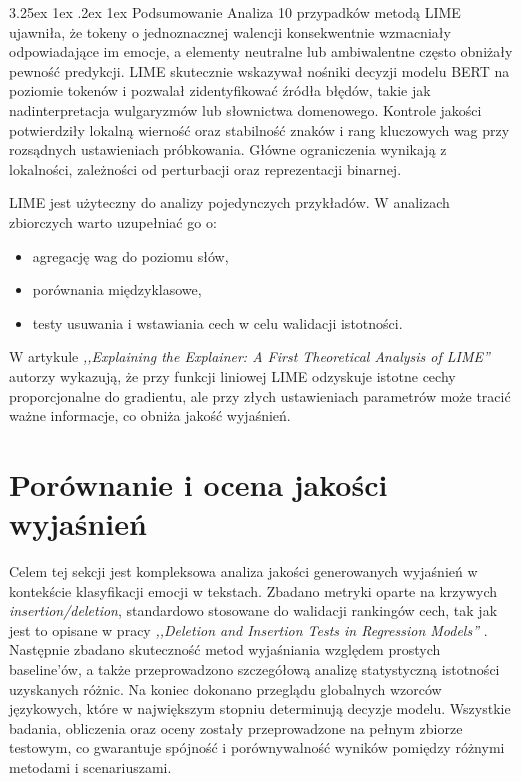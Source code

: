 \documentclass[wmii, inf, mgr]{uwmthesis}
\makeatletter
\renewcommand\paragraph{\@startsection{paragraph}{4}{\z@}%
  {3.25ex \@plus1ex \@minus.2ex}%
  {1ex}%
  {\normalfont\normalsize\bfseries}}
\makeatother
\begin{document}
\paragraph{Podsumowanie}
Analiza 10 przypadków metodą LIME ujawniła, że tokeny o jednoznacznej walencji konsekwentnie wzmacniały odpowiadające im emocje, a elementy neutralne lub ambiwalentne często obniżały pewność predykcji. LIME skutecznie wskazywał nośniki decyzji modelu BERT na poziomie tokenów i pozwalał zidentyfikować źródła błędów, takie jak nadinterpretacja wulgaryzmów lub słownictwa domenowego. Kontrole jakości potwierdziły lokalną wierność oraz stabilność znaków i rang kluczowych wag przy rozsądnych ustawieniach próbkowania. Główne ograniczenia wynikają z lokalności, zależności od perturbacji oraz reprezentacji binarnej.

LIME jest użyteczny do analizy pojedynczych przykładów. W analizach zbiorczych warto uzupełniać go o:
\begin{itemize}
	\item agregację wag do poziomu słów,
	\item porównania międzyklasowe,
	\item testy usuwania i wstawiania cech w celu walidacji istotności.
\end{itemize}

W artykule \textit{,,Explaining the Explainer: A First Theoretical Analysis of LIME''} \cite{LIME} autorzy wykazują, że przy funkcji liniowej LIME odzyskuje istotne cechy proporcjonalne do gradientu, ale przy złych ustawieniach parametrów może tracić ważne informacje, co obniża jakość wyjaśnień.



\section{Porównanie i ocena jakości wyjaśnień}
Celem tej sekcji jest kompleksowa analiza jakości generowanych wyjaśnień w kontekście klasyfikacji emocji w tekstach. Zbadano  metryki oparte na krzywych \emph{insertion/deletion}, standardowo stosowane do walidacji rankingów cech, tak jak jest to opisane w pracy \textit{,,Deletion and Insertion Tests in Regression Models''} \cite{LIMEandSHAP2}. Następnie zbadano skuteczność metod wyjaśniania względem prostych baseline’ów, a także przeprowadzono szczegółową analizę statystyczną istotności uzyskanych różnic. Na koniec dokonano przeglądu globalnych wzorców językowych, które w największym stopniu determinują decyzje modelu. Wszystkie badania, obliczenia oraz oceny zostały przeprowadzone na pełnym zbiorze testowym, co gwarantuje spójność i porównywalność wyników pomiędzy różnymi metodami i scenariuszami.
\end{document}
